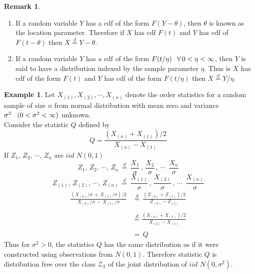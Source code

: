 \documentclass[12pt,a4paper]{report}
\theoremstyle{definition}
\newtheorem{exa}[thm]{Example}
\newtheorem{remark}[thm]{Remark}
\theoremstyle{plain}
\begin{document}
\newpage
\begin{remark}
\begin{enumerate}
\item[(i)] If a random variable $Y$ has a cdf of the form $F(Y - \theta)$, then $\theta$ is known as the location parameter. Therefore if $X$ has cdf $F(t)$ and $Y$ has cdf of $F(t - \theta)$ then $X\overset{d}{=} Y - \theta$.
\item[(ii)] If a random variable $Y$ has a cdf of the form $F(t/\eta) \,\hspace{0.2cm} \forall \, 0 < \eta < \infty$, then $Y$ is said to have a distribution indexed by the sample parameter $\eta$. Thus is $X$ has cdf of the form $F(t)$ and $Y$ has cdf of the form $F(t/\eta)$ then $X\overset{d}{=}Y/\eta$.\\
\end{enumerate}
\end{remark}



\begin{exa}
Let $X_{(1)}, X_{(2)}, \cdots, X_{(n)}$ denote the order statistics for a random sample of size $n$ from normal distribution with mean zero and variance $\sigma^2\hspace{0.3cm} (0 < \sigma^2 < \infty)$ unknown.\\
Consider the statistic $Q$ defined by 
$$Q = \frac{(X_{(n)} + X_{(1)})/2}{X_{(n)} - X_{(1)}}$$
If $Z_1, \, Z_2, \, \cdots,\, Z_n$ are $iid\, \, N(0, 1)$
$$Z_1, \, Z_2, \, \cdots, \, Z_n \, \overset{d}{=}\, \frac{X_1}{\sigma}\, , \, \frac{X_2}{\sigma}\, ,\, \cdots\, \, \, \frac{X_n}{\sigma}$$
$$Z_{(1)}, \, Z_{(2)}, \, \cdots, \, Z_{(n)}\,  \overset{d}{=}\,  \frac{X_{(1)}}{\sigma}\, , \, \frac{X_{(2)}}{\sigma}\, ,\, \cdots\, \, \, \frac{X_{(n)}}{\sigma}$$
\begin{align*}
\frac{(X_{(n)}/\sigma \, + \, X_{(1)}/\sigma)/2}{X_{(n)}/\sigma\, - \, X_{(1)}/\sigma} & \overset{d}{=}\, \frac{(Z_{(n)} + Z_{(1)})/2}{Z_{(n)} - Z_{(1)}}\\\\
& \overset{d}{=} \frac{(X_{(n)} + X_{(1)})/2}{X_{(2)} - X_{(1)}}\\\\ & = \, Q
\end{align*}
Thus for $\sigma^2 > 0$, the statistics $Q$ has the same distribution as if it were constructed using observations from $N(0,1)$. Therefore statistic $Q$ is distribution free over the class $\mathscr{Z}_3$ of the joint distribution of $iid\, \, N(0, \sigma^2)$.
\end{exa}
\end{document}
